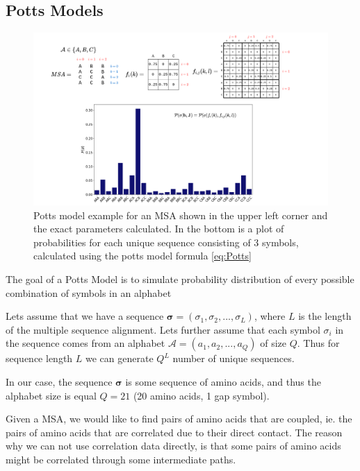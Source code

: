 \subsection{Potts Models}

\begin{figure}
    \centering
    \includegraphics[width=\linewidth]{imgs_tomas/potts_example.png}
    \caption{Potts model example for an MSA shown in the upper left corner and the exact parameters calculated. In the bottom is a plot of probabilities for each unique sequence consisting of 3 symbols, calculated using the potts model formula \ref{eq:Potts}}
    \label{fig:potts_example}
\end{figure}

The goal of a Potts Model is to simulate probability distribution of every possible combination of symbols in an alphabet

Lets assume that we have a sequence $\boldsymbol{\sigma} = (\sigma_1, \sigma_2, ..., \sigma_L)$, where $L$ is the length of the multiple sequence alignment. 
Lets further assume that each symbol $\sigma_i$ in the sequence comes from an alphabet $\mathcal{A} = (a_1, a_2, ..., a_Q)$ of size $Q$. 
Thus for sequence length $L$ we can generate $Q^L$ number of unique sequences.
    
In our case, the sequence $\boldsymbol{\sigma}$ is some sequence of amino acids, and thus the alphabet size is equal $Q = 21$ (20 amino acids, 1 gap symbol).
        
Given a MSA, we would like to find pairs of amino acids that are coupled, ie. the pairs of amino acids that are correlated due to their direct contact. 
The reason why we can not use correlation data directly, is that some pairs of amino acids might be correlated through some intermediate paths.
        
